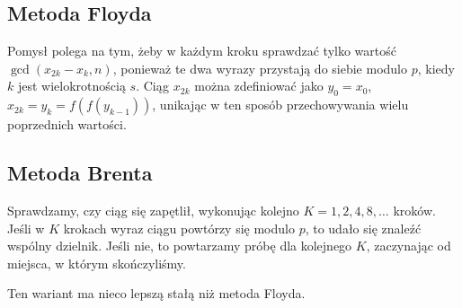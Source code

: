 \subsection{Metoda Floyda}
Pomysł polega na tym, żeby w każdym kroku sprawdzać tylko wartość \( \gcd(x_{2k} - x_k, n) \), ponieważ te dwa wyrazy przystają do siebie modulo \( p \), kiedy \( k \) jest wielokrotnością \( s \).
Ciąg \( x_{2k} \) można zdefiniować jako \( y_0 = x_0 \), \( x_{2k} = y_k = f(f(y_{k-1})) \), unikając w ten sposób przechowywania wielu poprzednich wartości.

\subsection{Metoda Brenta}
Sprawdzamy, czy ciąg się zapętlił, wykonując kolejno \( K = 1, 2, 4, 8, \dots \) kroków. Jeśli w \( K \) krokach wyraz ciągu powtórzy się modulo \( p \), to udało się znaleźć wspólny dzielnik. Jeśli nie, to powtarzamy próbę dla kolejnego \( K \), zaczynając od miejsca, w którym skończyliśmy.

Ten wariant ma nieco lepszą stałą niż metoda Floyda.
